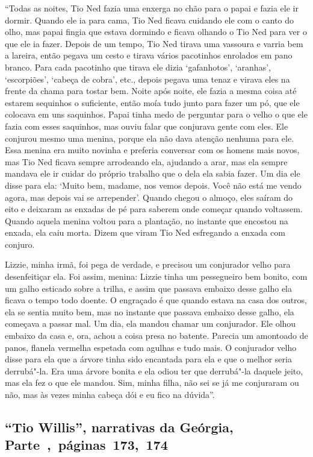 ``Todas as noites, Tio Ned fazia uma enxerga no chão para o papai e
fazia ele ir dormir. Quando ele ia para cama, Tio Ned ficava cuidando
ele com o canto do olho, mas papai fingia que estava dormindo e ficava
olhando o Tio Ned para ver o que ele ia fazer. Depois de um tempo, Tio
Ned tirava uma vassoura e varria bem a lareira, então pegava um cesto e
tirava vários pacotinhos enrolados em pano branco. Para cada pacotinho
que tirava ele dizia `gafanhotos', `aranhas', `escorpiões', `cabeça de
cobra', etc., depois pegava uma tenaz e virava eles na frente da chama
para tostar bem. Noite após noite, ele fazia a mesma coisa até estarem
sequinhos o suficiente, então moía tudo junto para fazer um pó, que ele
colocava em uns saquinhos. Papai tinha medo de perguntar para o velho o
que ele fazia com esses saquinhos, mas ouviu falar que conjurava gente
com eles. Ele conjurou mesmo uma menina, porque ela não dava atenção
nenhuma para ele. Essa menina era muito novinha e preferia conversar com
os homens mais novos, mas Tio Ned ficava sempre arrodeando ela, ajudando
a arar, mas ela sempre mandava ele ir cuidar do próprio trabalho que o
dela ela sabia fazer. Um dia ele disse para ela: `Muito bem, madame, nos
vemos depois. Você não está me vendo agora, mas depois vai se
arrepender'. Quando chegou o almoço, eles saíram do eito e deixaram as
enxadas de pé para saberem onde começar quando voltassem. Quando aquela
menina voltou para a plantação, no instante que encostou na enxada, ela
caiu morta. Dizem que viram Tio Ned esfregando a enxada com conjuro.

Lizzie, minha irmã, foi pega de verdade, e precisou um conjurador velho
para desenfeitiçar ela. Foi assim, menina: Lizzie tinha um pessegueiro
bem bonito, com um galho esticado sobre a trilha, e assim que passava
embaixo desse galho ela ficava o tempo todo doente. O engraçado é que
quando estava na casa dos outros, ela se sentia muito bem, mas no
instante que passava embaixo desse galho, ela começava a passar mal. Um
dia, ela mandou chamar um conjurador. Ele olhou embaixo da casa e, ora,
achou a coisa presa no batente. Parecia um amontoado de panos, flanela
vermelha espetada com agulhas e tudo mais. O conjurador velho disse para
ela que a árvore tinha sido encantada para ela e que o melhor seria
derrubá"-la. Era uma árvore bonita e ela odiou ter que derrubá"-la daquele
jeito, mas ela fez o que ele mandou. Sim, minha filha, não sei se já me
conjuraram ou não, mas às vezes minha cabeça dói e eu fico na dúvida''.

\subsection{``Tio Willis'', narrativas da Geórgia, Parte~,~páginas~173,~174}
\label{ref323}


